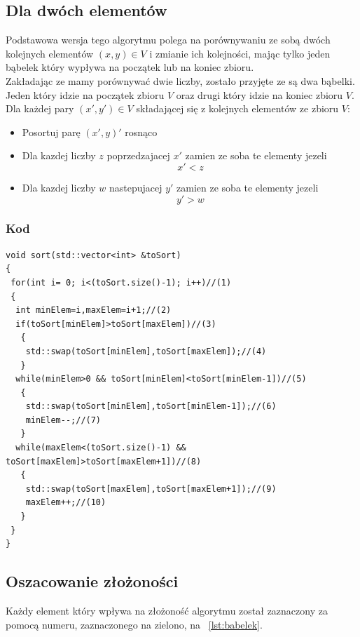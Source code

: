 \subsection{Dla dwóch elementów}
Podstawowa wersja tego algorytmu polega na porównywaniu ze sobą dwóch kolejnych elementów $(x,y) \in V$ i zmianie ich kolejności, mając tylko jeden bąbelek który wypływa na początek lub na koniec zbioru. \\
Zakładając ze mamy porównywać dwie liczby, zostało przyjęte ze są dwa bąbelki. Jeden który idzie na początek zbioru  $V$ oraz drugi który idzie na koniec zbioru $V$. \\
Dla każdej pary $(x',y') \in V$ składającej się z kolejnych elementów ze zbioru $V$:
\begin{itemize} 
\item Posortuj parę $(x',y)'$ rosnąco
\item Dla kazdej liczby $z$ poprzedzajacej $x'$ zamien ze soba te elementy jezeli\begin{equation*}x' < z\end{equation*} 
\item  Dla kazdej liczby $w$ nastepujacej $y'$ zamien ze soba te elementy jezeli \begin{equation*}y'>w\end{equation*}
 \end{itemize}  

\subsubsection*{Kod}

\begin{lstlisting}[caption={Sortowanie babelkowe dla par},label={lst:babelek}]
void sort(std::vector<int> &toSort)
{
 for(int i= 0; i<(toSort.size()-1); i++)//(1)
 {
  int minElem=i,maxElem=i+1;//(2)
  if(toSort[minElem]>toSort[maxElem])//(3)
   {
    std::swap(toSort[minElem],toSort[maxElem]);//(4)
   }
  while(minElem>0 && toSort[minElem]<toSort[minElem-1])//(5)
   {
    std::swap(toSort[minElem],toSort[minElem-1]);//(6)
    minElem--;//(7)
   }
  while(maxElem<(toSort.size()-1) && toSort[maxElem]>toSort[maxElem+1])//(8)
   {
    std::swap(toSort[maxElem],toSort[maxElem+1]);//(9)
    maxElem++;//(10)
   } 
 }
}
\end{lstlisting}
 \subsection*{Oszacowanie złożoności}
 Każdy element który wpływa na złożoność algorytmu został zaznaczony za pomocą numeru, zaznaczonego na zielono, na \lstlistingnames ~\ref{lst:babelek}.
